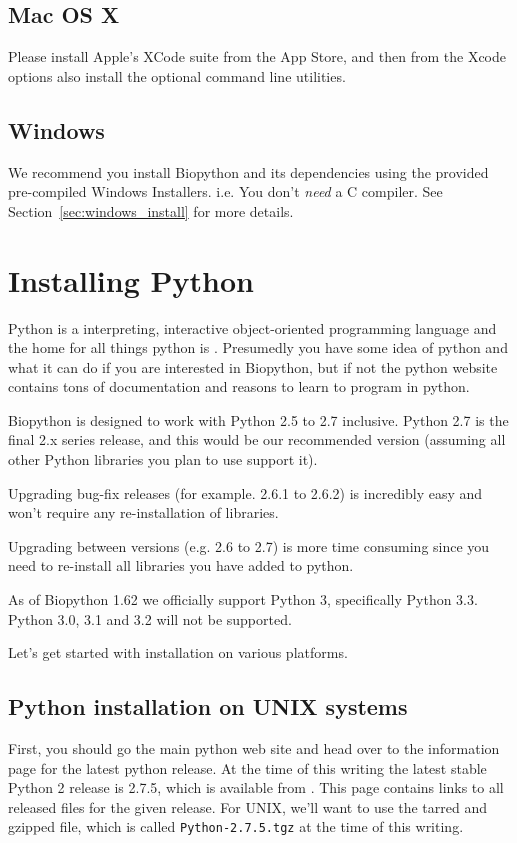 \documentclass{article}
\begin{document}
\subsection{Mac OS X}
Please install Apple's XCode suite from the App Store, and then from
the Xcode options also install the optional command line utilities.

\subsection{Windows}
We recommend you install Biopython and its dependencies using the
provided pre-compiled Windows Installers. i.e. You don't \emph{need}
a C compiler. See Section~\ref{sec:windows_install} for more details.

\section{Installing Python}

Python is a interpreting, interactive object-oriented programming
language and the home for all things python is
. Presumedly you have some idea of
python and what it can do if you are interested in Biopython, but if not
the python website contains tons of documentation and reasons to learn
to program in python.

Biopython is designed to work with Python 2.5 to 2.7 inclusive.
Python 2.7 is the final 2.x series release, and this would be our
recommended version (assuming all other Python libraries you plan
to use support it).

Upgrading bug-fix releases (for example. 2.6.1 to 2.6.2) 
is incredibly easy and won't require any re-installation of libraries.

Upgrading between versions (e.g. 2.6 to 2.7) is more time consuming since you
need to re-install all libraries you have added to python.

As of Biopython 1.62 we officially support Python 3, specifically Python 3.3.
Python 3.0, 3.1 and 3.2 will not be supported.

Let's get started with installation on various platforms.

\subsection{Python installation on UNIX systems}

First, you should go the main python web site and head over to the information
page for the latest python release. At the time of this writing the
latest stable Python 2 release is 2.7.5, which is available from
. This page contains links
to all released files for the given release. For UNIX, we'll want to use
the tarred and gzipped file, which is called \verb|Python-2.7.5.tgz| at
the time of this writing.
\end{document}
